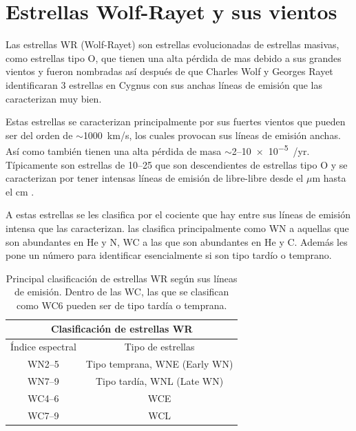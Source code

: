 \documentclass{book}
\begin{document}
\section{Estrellas Wolf-Rayet y sus vientos}

Las estrellas WR (Wolf-Rayet) son estrellas evolucionadas de estrellas masivas, como estrellas tipo O, que tienen una alta pérdida de mas debido a sus grandes vientos y fueron nombradas así después de que Charles Wolf y Georges Rayet identificaran 3 estrellas en Cygnus con sus  anchas líneas de emisión que las caracterizan muy bien. 

Estas estrellas se caracterizan principalmente por sus fuertes vientos que pueden ser del orden de $\sim$\SI{1000}{km/s}, los cuales provocan sus líneas de emisión anchas. Así como también tienen una alta pérdida de masa $\sim$2--\SI{10e-5}{\msun/yr}. Típicamente son estrellas de 10--\SI{25}{\msun} que son descendientes de estrellas tipo O y se caracterizan por tener intensas líneas de emisión de libre-libre desde el $\mu$m hasta el cm \citep{crowther:2007}.

A estas estrellas se les clasifica por el cociente que hay entre sus líneas de emisión intensa que las caracterizan. \cite{Smith:1968} las clasifica principalmente como WN a aquellas que son abundantes en He y N, WC a las que son abundantes en He y C. Además les pone un número para identificar esencialmente si son tipo tardío o temprano.

\begin{table}[h!]
    \begin{center}
        \begin{tabular}{c c}
        \toprule
        \multicolumn{2}{c}{Clasificación de estrellas WR} \\ \midrule
        Índice espectral    & Tipo de estrellas\\ \midrule
        WN2--5     & Tipo temprana, WNE (Early WN)\\
        WN7--9 & Tipo tardía, WNL (Late WN) \\
        WC4--6 & WCE\\
        WC7--9 & WCL \\ \bottomrule
        \end{tabular}
    \caption{Principal clasificación de estrellas WR  según sus líneas de emisión. Dentro de las WC, las que se clasifican como WC6 pueden ser de tipo tardía o temprana.}
    \label{tab:WR-clasificacion}
    \end{center}
\end{table}
\end{document}

